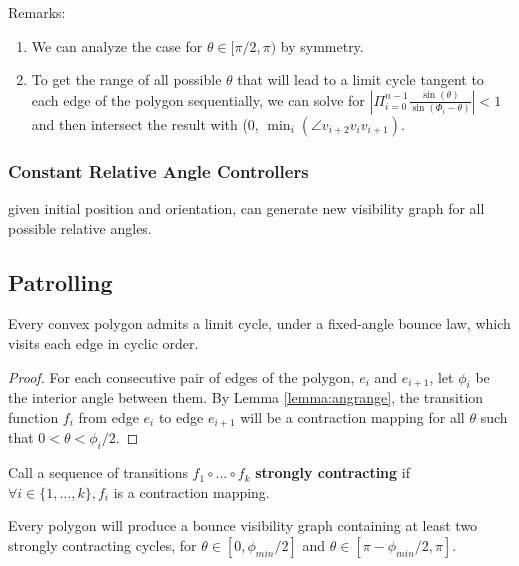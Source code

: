 \documentclass[]{styles/svproc}  %
\begin{document}
Remarks:
\begin{enumerate}
    \item We can analyze the case for $\theta \in [\pi/2, \pi)$ by symmetry.
    \item To get the range of all possible $\theta$ that will lead to a limit cycle tangent to each edge of the polygon sequentially, we can solve for $|\Pi_{i = 0}^{n-1}\frac{\sin(\theta)}{\sin(\Phi_{i}-\theta)}|<1$ and then intersect the result with (0, $\min_{i}(\angle v_{i+2}v_{i}v_{i+1})$.
\end{enumerate}





\subsubsection{Constant Relative Angle Controllers}

given initial position and orientation, can generate new visibility graph for
all possible relative angles.

\subsection{Patrolling \label{sec:cycles}}


\begin{proposition}
Every convex polygon admits a limit cycle, under a fixed-angle bounce law, 
which visits each edge in cyclic order.
\end{proposition}

\begin{proof}

For each consecutive pair of edges of the polygon, $e_i$ and $e_{i+1}$, let
$\phi_i$ be the interior angle between them. By Lemma \ref{lemma:angrange}, the
transition function $f_i$ from edge $e_i$ to edge $e_{i+1}$ will be a
contraction mapping for all $\theta$ such that $0 < \theta < \phi_i/2$.


\end{proof}

\begin{definition}
Call a sequence of transitions $f_1 \circ \ldots \circ f_k$ \textbf{strongly
contracting} if $\forall i \in \{1, \ldots, k\}, f_i$ is a contraction mapping.
\end{definition}

\begin{corollary}
Every polygon will produce a bounce visibility graph containing at least two
strongly contracting cycles, for $\theta \in [0, \phi_{min}/2]$ and $\theta \in
[\pi - \phi_{min}/2, \pi]$.
\end{corollary}
\end{document}
